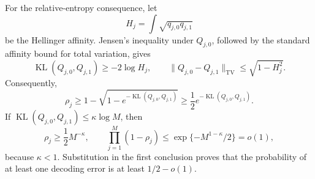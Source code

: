 For the relative-entropy consequence, let
\[
 H_j=\int\sqrt{q_{j,0}q_{j,1}}
\]
be the Hellinger affinity.  Jensen's inequality under \(Q_{j,0}\), followed by the standard affinity bound for total variation, gives
\[
 \operatorname{KL}(Q_{j,0},Q_{j,1})\geq-2\log H_j,
 \qquad
 \lVert Q_{j,0}-Q_{j,1}\rVert_{\mathrm{TV}}
 \leq\sqrt{1-H_j^2}.
\]
Consequently,
\[
 \rho_j
 \geq1-\sqrt{1-e^{-\operatorname{KL}(Q_{j,0},Q_{j,1})}}
 \geq\frac12e^{-\operatorname{KL}(Q_{j,0},Q_{j,1})}.
\]
If \(\operatorname{KL}(Q_{j,0},Q_{j,1})\leq\kappa\log M\), then
\[
 \rho_j\geq\frac12M^{-\kappa},
 \qquad
 \prod_{j=1}^M(1-\rho_j)
 \leq\exp\{-M^{1-\kappa}/2\}=o(1),
\]
because \(\kappa<1\).  Substitution in the first conclusion proves that the probability of at least one decoding error is at least \(1/2-o(1)\).